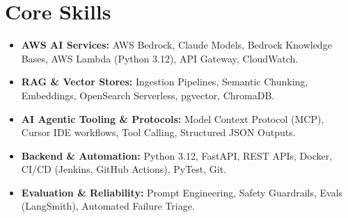 \documentclass[a4paper,10pt]{article}
\begin{document}
\section{Core Skills}
\begin{itemize}
  \item \textbf{AWS AI Services:} AWS Bedrock, Claude Models, Bedrock Knowledge Bases, AWS Lambda (Python 3.12), API Gateway, CloudWatch.
  \item \textbf{RAG \& Vector Stores:} Ingestion Pipelines, Semantic Chunking, Embeddings, OpenSearch Serverless, pgvector, ChromaDB.
  \item \textbf{AI Agentic Tooling \& Protocols:} Model Context Protocol (MCP), Cursor IDE workflows, Tool Calling, Structured JSON Outputs.
  \item \textbf{Backend \& Automation:} Python 3.12, FastAPI, REST APIs, Docker, CI/CD (Jenkins, GitHub Actions), PyTest, Git.
  \item \textbf{Evaluation \& Reliability:} Prompt Engineering, Safety Guardrails, Evals (LangSmith), Automated Failure Triage.
\end{itemize}
\end{document}
